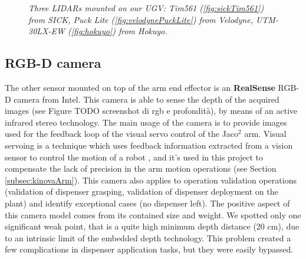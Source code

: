 \begin{figure}
	\centering
	\caption{\textit{Three \ac{LIDAR}s mounted on our \ac{UGV}: Tim561 (\ref{fig:sickTim561}) from SICK, Puck Lite (\ref{fig:velodynePuckLite}) from Velodyne, UTM-30LX-EW (\ref{fig:hokuyo}) from Hokuyo.}}
\end{figure}

\subsection{RGB-D camera}
The other sensor mounted on top of the arm end effector is an \textbf{RealSense} RGB-D camera from Intel. This camera is able to sense the depth of the acquired images (see Figure TODO screenshot di rgb e profondità), by means of an active infrared stereo technology. The main usage of the camera is to provide images used for the feedback loop of the visual servo control of the Jaco$^2$ arm. Visual servoing is a technique which uses feedback information extracted from a vision sensor to control the motion of a robot \parencite{visualServo}, and it's used in this project to compensate the lack of precision in the arm motion operations (see Section \ref{subsec:kinovaArm}). This camera also applies to operation validation operations (validation of dispenser grasping, validation of dispenser deployment on the plant) and identify exceptional cases (no dispenser left). The positive aspect of this camera model comes from its contained size and weight. We spotted only one significant weak point, that is a quite high minimum depth distance (20 cm), due to an intrinsic limit of the embedded depth technology. This problem created a few complications in dispenser application tasks, but they were easily bypassed.


